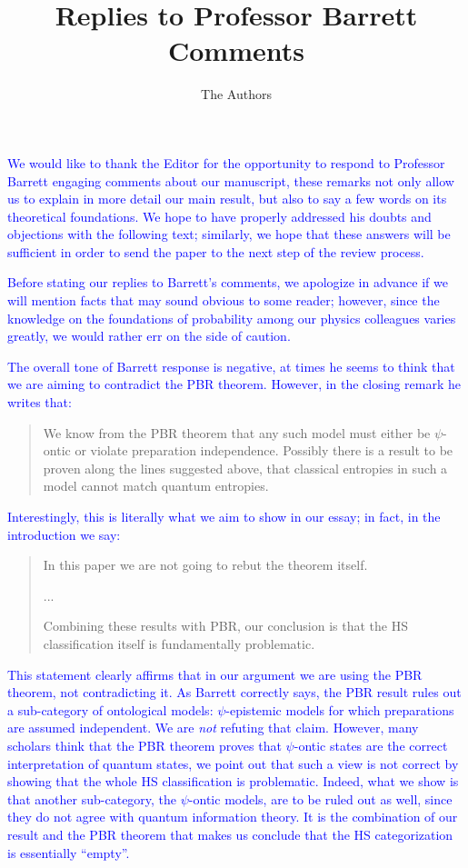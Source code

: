 \documentclass[11pt]{article}
\begin{document}
	
	
\title{\textbf{Replies to Professor Barrett Comments}}

\author{The Authors}

\maketitle

	
\textcolor{blue}{We would like to thank the Editor for the opportunity to respond to Professor Barrett engaging comments about our manuscript, these remarks not only allow us to explain in more detail our main result, but also to say a few words on its theoretical foundations. We hope to have properly addressed his doubts and objections with the following text; similarly, we hope that these answers will be sufficient in order to send the paper to the next step of the review process.}

\textcolor{blue}{Before stating our replies to Barrett's comments, we apologize in advance if we will mention facts that may sound obvious to some reader; however, since the knowledge on the foundations of probability among our physics colleagues varies greatly, we would rather err on the side of caution.}
\vspace{2mm}

\textcolor{blue}{The overall tone of Barrett response is negative, at times he seems to think that we are aiming to contradict the PBR theorem. However, in the closing remark he writes that:}
\begin{quote}
We know from the PBR theorem that	 any such model must either be $\psi$-ontic or violate preparation independence. Possibly there is a result to be proven along the lines suggested above, that classical entropies in such a model cannot match quantum entropies.
\end{quote}

\noindent \textcolor{blue}{Interestingly, this is literally what we aim to show in our essay; in fact, in the introduction we say:}
\begin{quote}		
In this paper we are not going to rebut the theorem itself.
			
			...
		
Combining these results with PBR, our conclusion is that the HS classification itself is fundamentally problematic.
\end{quote}

	\textcolor{blue}{This statement clearly affirms that in our argument we are using the PBR theorem, not contradicting it. As Barrett correctly says, the PBR result rules out a sub-category of ontological models: $\psi$-epistemic models for which preparations are assumed independent. We are \emph{not} refuting that claim. However, many scholars think that the PBR theorem proves that $\psi$-ontic states are the correct interpretation of quantum states, we point out that such a view is not correct by showing that the whole HS classification is problematic. Indeed, what we show is that another sub-category, the $\psi$-ontic models, are to be ruled out as well, since they do not agree with quantum information theory. It is the combination of our result and the PBR theorem that makes us conclude that the HS categorization is essentially ``empty''.}
\end{document}
